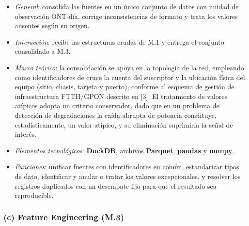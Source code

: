\documentclass[12pt,a4paper]{article}
\begin{document}
\begin{itemize}
    \item \textit{General}: consolida las fuentes en un único conjunto de datos con unidad de observación ONT-día, corrige inconsistencias de formato y trata los valores ausentes según su origen.
    \item \textit{Interacción}: recibe las estructuras crudas de M.1 y entrega el conjunto consolidado a M.3.
    \item \textit{Marco teórico}: la consolidación se apoya en la topología de la red, empleando como identificadores de cruce la cuenta del suscriptor y la ubicación física del equipo (sitio, chasis, tarjeta y puerto), conforme al esquema de gestión de infraestructura FTTH/GPON descrito en [3]. El tratamiento de valores atípicos adopta un criterio conservador, dado que en un problema de detección de degradaciones la caída abrupta de potencia constituye, estadísticamente, un valor atípico, y su eliminación suprimiría la señal de interés.
    \item \textit{Elementos tecnológicos}: \textbf{DuckDB}, archivos \textbf{Parquet}, \textbf{pandas} y \textbf{numpy}.
    \item \textit{Funciones}: unificar fuentes con identificadores en común, estandarizar tipos de dato, identificar y anular o tratar los valores excepcionales, y resolver los registros duplicados con un desempate fijo para que el resultado sea reproducible.
\end{itemize}


\subsubsection*{(c) Feature Engineering (M.3)}
 
\end{document}
